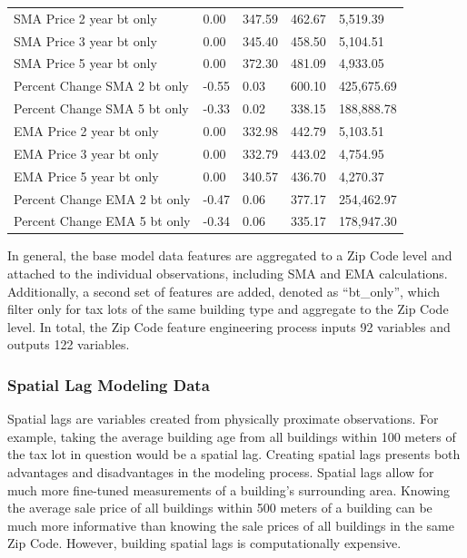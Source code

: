 \documentclass[12pt,]{article}
\begin{document}
\begin{table}
{\begin{tabular}[t]{lllll}
\addlinespace
SMA Price 2 year bt only & 0.00 & 347.59 & 462.67 & 5,519.39\\
SMA Price 3 year bt only & 0.00 & 345.40 & 458.50 & 5,104.51\\
SMA Price 5 year bt only & 0.00 & 372.30 & 481.09 & 4,933.05\\
Percent Change SMA 2 bt only & -0.55 & 0.03 & 600.10 & 425,675.69\\
Percent Change SMA 5 bt only & -0.33 & 0.02 & 338.15 & 188,888.78\\
\addlinespace
EMA Price 2 year bt only & 0.00 & 332.98 & 442.79 & 5,103.51\\
EMA Price 3 year bt only & 0.00 & 332.79 & 443.02 & 4,754.95\\
EMA Price 5 year bt only & 0.00 & 340.57 & 436.70 & 4,270.37\\
Percent Change EMA 2 bt only & -0.47 & 0.06 & 377.17 & 254,462.97\\
Percent Change EMA 5 bt only & -0.34 & 0.06 & 335.17 & 178,947.30\\
\bottomrule
\end{tabular}}
\end{table}

In general, the base model data features are aggregated to a Zip Code
level and attached to the individual observations, including SMA and EMA
calculations. Additionally, a second set of features are added, denoted
as ``bt\_only'', which filter only for tax lots of the same building
type and aggregate to the Zip Code level. In total, the Zip Code feature
engineering process inputs 92 variables and outputs 122 variables.

\hypertarget{spatial-lag-modeling-data}{%
\subsubsection{Spatial Lag Modeling
Data}\label{spatial-lag-modeling-data}}

Spatial lags are variables created from physically proximate
observations. For example, taking the average building age from all
buildings within 100 meters of the tax lot in question would be a
spatial lag. Creating spatial lags presents both advantages and
disadvantages in the modeling process. Spatial lags allow for much more
fine-tuned measurements of a building's surrounding area. Knowing the
average sale price of all buildings within 500 meters of a building can
be much more informative than knowing the sale prices of all buildings
in the same Zip Code. However, building spatial lags is computationally
expensive.
\end{document}
